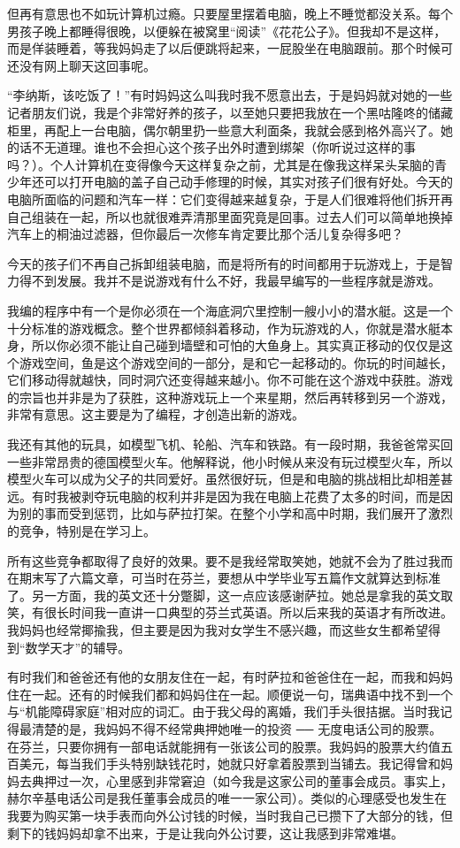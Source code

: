 但再有意思也不如玩计算机过瘾。只要屋里摆着电脑，晚上不睡觉都没关系。每个男孩子晚上都睡得很晚，以便躲在被窝里“阅读”《花花公子》。但我却不是这样，而是佯装睡着，等我妈妈走了以后便跳将起来，一屁股坐在电脑跟前。那个时候可还没有网上聊天这回事呢。

“李纳斯，该吃饭了！”有时妈妈这么叫我时我不愿意出去，于是妈妈就对她的一些记者朋友们说，我是个非常好养的孩子，以至她只要把我放在一个黑咕隆咚的储藏柜里，再配上一台电脑，偶尔朝里扔一些意大利面条，我就会感到格外高兴了。她的话不无道理。谁也不会担心这个孩子出外时遭到绑架（你听说过这样的事吗？）。个人计算机在变得像今天这样复杂之前，尤其是在像我这样呆头呆脑的青少年还可以打开电脑的盖子自己动手修理的时候，其实对孩子们很有好处。今天的电脑所面临的问题和汽车一样：它们变得越来越复杂，于是人们很难将他们拆开再自己组装在一起，所以也就很难弄清那里面究竟是回事。过去人们可以简单地换掉汽车上的桐油过滤器，但你最后一次修车肯定要比那个活儿复杂得多吧？

今天的孩子们不再自己拆卸组装电脑，而是将所有的时间都用于玩游戏上，于是智力得不到发展。我并不是说游戏有什么不好，我最早编写的一些程序就是游戏。

我编的程序中有一个是你必须在一个海底洞穴里控制一艘小小的潜水艇。这是一个十分标准的游戏概念。整个世界都倾斜着移动，作为玩游戏的人，你就是潜水艇本身，所以你必须不能让自己碰到墙壁和可怕的大鱼身上。其实真正移动的仅仅是这个游戏空间，鱼是这个游戏空间的一部分，是和它一起移动的。你玩的时间越长，它们移动得就越快，同时洞穴还变得越来越小。你不可能在这个游戏中获胜。游戏的宗旨也并非是为了获胜，这种游戏玩上一个来星期，然后再转移到另一个游戏，非常有意思。这主要是为了编程，才创造出新的游戏。

我还有其他的玩具，如模型飞机、轮船、汽车和铁路。有一段时期，我爸爸常买回一些非常昂贵的德国模型火车。他解释说，他小时候从来没有玩过模型火车，所以模型火车可以成为父子的共同爱好。虽然很好玩，但是和电脑的挑战相比却相差甚远。有时我被剥夺玩电脑的权利并非是因为我在电脑上花费了太多的时间，而是因为别的事而受到惩罚，比如与萨拉打架。在整个小学和高中时期，我们展开了激烈的竞争，特别是在学习上。

所有这些竞争都取得了良好的效果。要不是我经常取笑她，她就不会为了胜过我而在期末写了六篇文章，可当时在芬兰，要想从中学毕业写五篇作文就算达到标准了。另一方面，我的英文还十分蹩脚，这一点应该感谢萨拉。她总是拿我的英文取笑，有很长时间我一直讲一口典型的芬兰式英语。所以后来我的英语才有所改进。我妈妈也经常揶揄我，但主要是因为我对女学生不感兴趣，而这些女生都希望得到“数学天才”的辅导。

有时我们和爸爸还有他的女朋友住在一起，有时萨拉和爸爸住在一起，而我和妈妈住在一起。还有的时候我们都和妈妈住在一起。顺便说一句，瑞典语中找不到一个与“机能障碍家庭”相对应的词汇。由于我父母的离婚，我们手头很拮据。当时我记得最清楚的是，我妈妈不得不经常典押她唯一的投资 ── 无度电话公司的股票。在芬兰，只要你拥有一部电话就能拥有一张该公司的股票。我妈妈的股票大约值五百美元，每当我们手头特别缺钱花时，她就只好拿着股票到当铺去。我记得曾和妈妈去典押过一次，心里感到非常窘迫（如今我是这家公司的董事会成员。事实上，赫尔辛基电话公司是我任董事会成员的唯一一家公司）。类似的心理感受也发生在我要为购买第一块手表而向外公讨钱的时候，当时我自己已攒下了大部分的钱，但剩下的钱妈妈却拿不出来，于是让我向外公讨要，这让我感到非常难堪。

